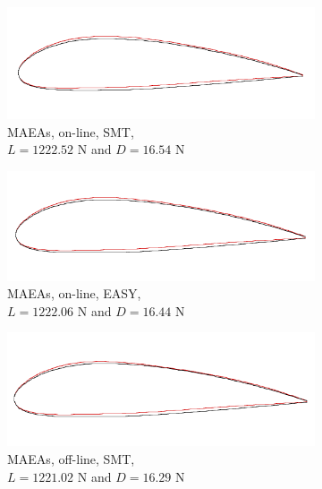 \documentclass[twoside, 12pt,notitlepage]{report}
\begin{document}
\begin{enumerate}
\begin{figure}[h!]
\centering
	\begin{subfigure}[b]{0.44\textwidth}
	\centering
	\caption{MAEAs, on-line, SMT, 
	\\  $L \!= \!1222.52$ N and $D \!= \!16.54$ N}
	\includegraphics[width=\textwidth]{takeoff_SOO_SMT} 
	\end{subfigure}
	\hfill
	\begin{subfigure}[b]{0.44\textwidth}
	\centering
	\caption{MAEAs, on-line, EASY, 
	\\ $L \!= \!1222.06$ N and $D \!= \!16.44$ N}
	\includegraphics[width=\textwidth, scale=1]{takeoff_SOO_EASY}   
	\end{subfigure}
	\hfill
	\begin{subfigure}[b]{0.44\textwidth}
	\centering
	\caption{MAEAs, off-line, SMT, 
	\\ $L \!= \!1221.02$ N and $D \!= \!16.29$ N}
	\includegraphics[width=\textwidth, scale=1]{takeoff_SOO_offline} 
	\end{subfigure}
	\hfill
	\begin{subfigure}[b]{0.44\textwidth}

\end{subfigure}
\end{figure}
\end{enumerate}
\end{document}
